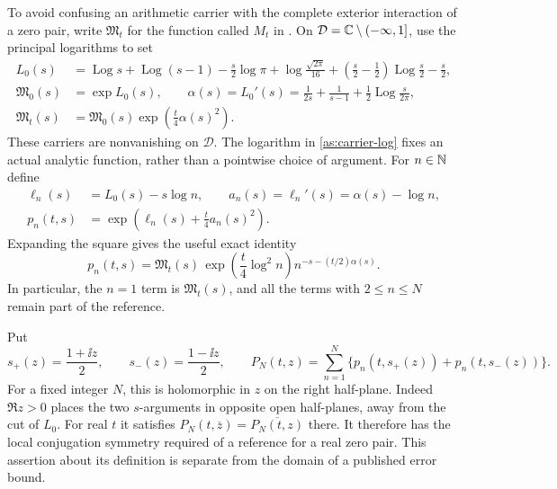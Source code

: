 To avoid confusing an arithmetic carrier with the complete exterior
interaction of a zero pair, write $\mathfrak M_t$ for the function called
$M_t$ in \cite{Polymath2019}.  On
$\mathcal D=\mathbb C\setminus(-\infty,1]$, use the principal logarithms to set
\begin{align}
 L_0(s)&=\operatorname{Log}s+\operatorname{Log}(s-1)
       -\frac{s}{2}\log\pi+\log\frac{\sqrt{2\pi}}{16}
       +\left(\frac{s}{2}-\frac12\right)
           \operatorname{Log}\frac{s}{2}-\frac{s}{2},
       \label{as:carrier-log}\\
 \mathfrak M_0(s)&=\exp L_0(s),\qquad
 \alpha(s)=L_0'(s)
       =\frac{1}{2s}+\frac{1}{s-1}
         +\frac12\operatorname{Log}\frac{s}{2\pi},
       \label{as:alpha}\\
 \mathfrak M_t(s)&=\mathfrak M_0(s)
                  \exp\left(\frac{t}{4}\alpha(s)^2\right).
       \label{as:carrier}
\end{align}
These carriers are nonvanishing on $\mathcal D$.  The logarithm in
\eqref{as:carrier-log} fixes an actual analytic function, rather than a
pointwise choice of argument.  For $n\in\mathbb N$ define
\begin{align}
 \ell_n(s)&=L_0(s)-s\log n,\qquad
 a_n(s)=\ell_n'(s)=\alpha(s)-\log n,\\
 p_n(t,s)&=\exp\left(\ell_n(s)+\frac{t}{4}a_n(s)^2\right).
       \label{as:pn}
\end{align}
Expanding the square gives the useful exact identity
\begin{equation}
 p_n(t,s)=\mathfrak M_t(s)\,
     \exp\left(\frac{t}{4}\log^2 n\right)
     n^{-s-(t/2)\alpha(s)}.
 \label{as:pn-dirichlet}
\end{equation}
In particular, the $n=1$ term is $\mathfrak M_t(s)$, and all the terms
with $2\le n\le N$ remain part of the reference.

Put
\begin{equation}
 s_+(z)=\frac{1+\ii z}{2},\qquad
 s_-(z)=\frac{1-\ii z}{2},\qquad
 P_N(t,z)=\sum_{n=1}^N\{p_n(t,s_+(z))+p_n(t,s_-(z))\}.
 \label{as:PN}
\end{equation}
For a fixed integer $N$, this is holomorphic in $z$ on the right
half-plane.  Indeed $\Re z>0$ places the two $s$-arguments in opposite
open half-planes, away from the cut of $L_0$.  For real $t$ it satisfies
$P_N(t,\overline z)=\overline{P_N(t,z)}$ there.  It therefore has the
local conjugation symmetry required of a reference for a real zero pair.
This assertion about its definition is separate from the domain of a
published error bound.

